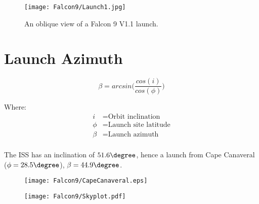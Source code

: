 \begin{figure}[!htb] 
    \centering
    \texttt{[image: Falcon9/Launch1.jpg]}
    \caption{An oblique view of a Falcon 9 V1.1 launch. \cite{SpaceXFalcon9}}
    \label{fig:Falcon9Launch}
\end{figure}


\section{Launch Azimuth}

\begin{equation}
\beta = arcsin \Big(\frac{cos(i)}{cos(\phi)}\Big)
\end{equation}

Where:
\begin{align*}
 i &= \text{Orbit inclination}\\
 \phi &= \text{Launch site latitude}\\
 \beta &= \text{Launch azimuth}\\
\end{align*}

\cite{LaunchDesign}

The \ac{ISS} has an inclination of $51.6\degree$, hence a launch from Cape Canaveral ($\phi = 28.5\degree$), $\beta=44.9\degree$.


\begin{figure}[!htb] 
    \centering
    \texttt{[image: Falcon9/CapeCanaveral.eps]}
    \caption{}
    \label{fig:LaunchPath}
\end{figure}




\begin{figure}[!htb] 
    \centering
    \texttt{[image: Falcon9/Skyplot.pdf]}
    \caption{}
    \label{fig:Skyplot}
\end{figure}




